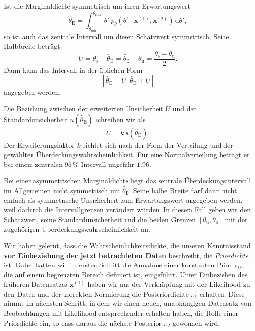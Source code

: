 Ist die Marginaldichte symmetrisch um ihren Erwartungswert
\begin{equation}
\widehat\theta_{\mathrm E} = \int_{\theta_{\mathrm{min}}}^{\theta_{\mathrm{max}}} \, \theta' \,
p_{\theta}(\theta'\mid\mathbf x^{(1)},\mathbf x^{(2)})
\,\mathrm d\theta',
\end{equation}
so ist auch das zentrale
Intervall um diesen Schätzwert symmetrisch. Seine
Halbbreite beträgt
\begin{equation}
U
=
\theta_{\mathrm o}-\widehat\theta_{\mathrm E}
=
\widehat\theta_{\mathrm E}-\theta_{\mathrm u}
=
\frac{\theta_{\mathrm o}-\theta_{\mathrm u}}{2}.
\end{equation}
Dann kann das Intervall in der üblichen Form
\[
[\widehat\theta_{\mathrm E}-U,\,
 \widehat\theta_{\mathrm E}+U]
\]
angegeben werden.

Die Beziehung zwischen der erweiterten Unsicherheit $U$
und der Standardunsicherheit
$u(\widehat\theta_{\mathrm E})$ schreiben wir als
\begin{equation}
U=k\,u(\widehat\theta_{\mathrm E}).
\label{eq:erweiterteunsicherheitposterior}
\end{equation}
Der Erweiterungsfaktor $k$ richtet sich nach der Form
der Verteilung und der gewählten Überdeckungswahrscheinlichkeit.
Für eine Normalverteilung beträgt er bei einem zentralen
$95\,\%$-Intervall ungefähr $1.96$.

Bei einer asymmetrischen Marginaldichte liegt das zentrale
Überdeckungsintervall im Allgemeinen nicht symmetrisch um
$\widehat\theta_{\mathrm E}$. Seine halbe Breite darf dann
nicht einfach als symmetrische Unsicherheit zum
Erwartungswert angegeben werden, weil dadurch die
Intervallgrenzen verändert würden.
In diesem Fall geben wir den Schätzwert, seine
Standardunsicherheit und die beiden Grenzen
$[\theta_{\mathrm u},\theta_{\mathrm o}]$ mit der zugehörigen
Überdeckungswahrscheinlichkeit an.

Wir haben gelernt, dass die Wahrscheinlichkeitsdichte, 
die unseren Kenntnisstand \textbf{vor Einbeziehung
der jetzt betrachteten Daten} beschreibt, die \textsl{Priordichte} ist.
Dabei hatten wir im ersten Schritt die Annahme einer konstanten Prior $\pi_0$, 
die auf einem begrenzten Bereich definiert ist, eingeführt. Unter Einbeziehen
des früheren Datensatzes $\mathbf x^{(1)}$ haben wir aus der Verknüpfung mit der 
Likelihood zu den Daten und der korrekten Normierung die Posteriordichte $\pi_1$
erhalten. Diese nimmt im nächsten Schritt, in dem wir einen neuen, unabhängigen
Datensatz von Beobachtungen mit Likelihood entsprechender erhalten haben, die Rolle einer Priordichte ein, so dass daraus die nächste Posterior $\pi_2$ gewonnen wird.

